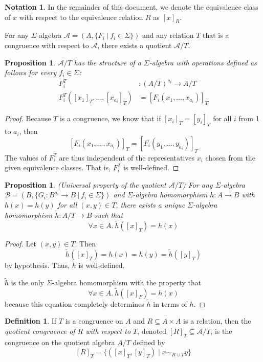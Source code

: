 \documentclass{msthesis}
\newtheorem{prop}[theorem]{Proposition}
\theoremstyle{definition}
\newtheorem{definition}[theorem]{Definition}
\newtheorem*{notation}{Notation}
\newcommand{\Amod}{\mathscr{A}}
\begin{document}
\begin{notation}
    In the remainder of this document, we denote the equivalence class of $x$ with respect to the equivalence relation $R$ as $[x]_R$.
\end{notation}


For any $\Sigma$-algebra $\Amod = (A, \{F_i\ |\ f_i \in \Sigma\})$ and any relation $T$ that is a congruence with respect to $\Amod$, there exists a quotient $\Amod/T$.

\begin{prop}
    $\Amod/T$ has the structure of a $\Sigma$-algebra with operations defined as follows for every $f_i \in \Sigma$:
\begin{align*}
    F^T_i &: (A/T)^{a_i} \to A/T \\
    F^T_i([x_1]_T, \dots, [x_{a_i}]_T) &= [F_i(x_1, \dots, x_{a_i})]_T
\end{align*}
\end{prop}
\begin{proof}
    Because $T$ is a congruence, we know that 
    if $[x_i]_T = [y_i]_T$ for all $i$ from 1 to $a_i$, then
    \[ [F_i(x_1, \dots, x_{a_i})]_T = [F_i(y_1, \dots, y_{a_i})]_T\]
    The values of $F^T_i$ are thus independent of the representatives $x_i$ chosen from the given equivalence classes.  That is, $F^T_i$ is well-defined.
\end{proof}

\newcommand{\Bmod}{\mathscr{B}}
\begin{prop} \label{prop:univ-quot}
    (Universal property of the quotient $\Amod/T$) For any  $\Sigma$-algebra $\mathscr{B} = (B, \{G_i : B^{a_i} \to B\ |\ f_i \in \Sigma\})$ and $\Sigma$-algebra homomorphism $h : A \to B$ with $h(x)=h(y)$ for all $(x,y) \in T$, there exists a unique $\Sigma$-algebra homomorphism $\tilde{h} : A/T \to B$ such that
    \[\forall x \in A.\ \tilde{h}([x]_T) = h(x)\]
\end{prop}

\begin{proof}
    Let $(x, y) \in T$. Then 
    \[ \tilde{h}([x]_T) = h(x) = h(y) = \tilde{h}([y]_T) \]
    by hypothesis.  Thus, $\tilde{h}$ is well-defined.

    $\tilde{h}$ is the only $\Sigma$-algebra homomorphism with the property that
    \[\forall x \in A.\ \tilde{h}([x]_F) = h(x)\]
    because this equation completely determines $\tilde{h}$ in terms of $h$.
\end{proof}

\begin{definition}\label{def:quotient_congruence}
    If $T$ is a congruence on $A$ and $R \subseteq A \times A$ is a relation, then the \emph{quotient congruence of $R$ with respect to $T$}, denoted $[R]_T \subseteq \Amod/T$, is the congruence on the quotient algebra $A/T$ defined by
    \[ [R]_T = \{ ([x]_T,[y]_T) \mid x \sim_{R \cup T} y\} \]  
\end{definition}
\end{document}
